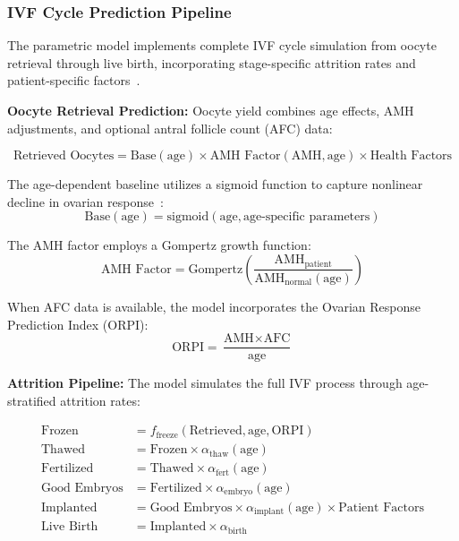 \subsubsection{IVF Cycle Prediction Pipeline}

The parametric model implements complete IVF cycle simulation from oocyte retrieval through live birth, incorporating stage-specific attrition rates and patient-specific factors~\cite{seifer2002amh,ovarian_reserve_testing}.

\textbf{Oocyte Retrieval Prediction:}
Oocyte yield combines age effects, AMH adjustments, and optional antral follicle count (AFC) data:

\begin{equation}
\text{Retrieved Oocytes} = \text{Base}(\text{age}) \times \text{AMH Factor}(\text{AMH}, \text{age}) \times \text{Health Factors}
\end{equation}

The age-dependent baseline utilizes a sigmoid function to capture nonlinear decline in ovarian response~\cite{acog2017advanced}:
\begin{equation}
\text{Base}(\text{age}) = \text{sigmoid}(\text{age}, \text{age-specific parameters})
\end{equation}

The AMH factor employs a Gompertz growth function:
\begin{equation}
\text{AMH Factor} = \text{Gompertz}\left(\frac{\text{AMH}_{\text{patient}}}{\text{AMH}_{\text{normal}}(\text{age})}\right)
\end{equation}

When AFC data is available, the model incorporates the Ovarian Response Prediction Index (ORPI):
\begin{equation}
\text{ORPI} = \frac{\text{AMH} \times \text{AFC}}{\text{age}}
\end{equation}

\textbf{Attrition Pipeline:}
The model simulates the full IVF process through age-stratified attrition rates:

\begin{align}
\text{Frozen} &= f_{\text{freeze}}(\text{Retrieved}, \text{age}, \text{ORPI}) \\
\text{Thawed} &= \text{Frozen} \times \alpha_{\text{thaw}}(\text{age}) \\
\text{Fertilized} &= \text{Thawed} \times \alpha_{\text{fert}}(\text{age}) \\
\text{Good Embryos} &= \text{Fertilized} \times \alpha_{\text{embryo}}(\text{age}) \\
\text{Implanted} &= \text{Good Embryos} \times \alpha_{\text{implant}}(\text{age}) \times \text{Patient Factors} \\
\text{Live Birth} &= \text{Implanted} \times \alpha_{\text{birth}}
\end{align}

